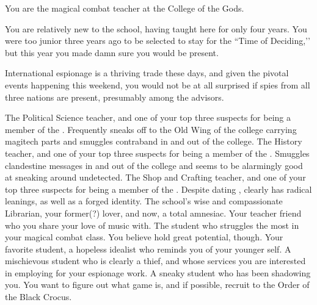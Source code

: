 \documentclass[char]{GL2020}
\begin{document}
\begin{itemz}[Notes]
    \item You are the magical combat teacher at the College of the Gods.
    \item You are relatively new to the school, having taught here for only four years. You were too junior three years ago to be selected to stay for the ``Time of Deciding,’’ but this year you made damn sure you would be present.
    \item International espionage is a thriving trade these days, and given the pivotal events happening this weekend, you would not be at all surprised if spies from all three nations are present, presumably among the advisors.
\end{itemz}

\begin{contacts}
    \contact{\cChupInventor{}} The Political Science teacher, and one of your top three suspects for being a member of the \pGoaties{}. Frequently sneaks off to the Old Wing of the college carrying magitech parts and smuggles contraband in and out of the college.
    \contact{\cHistory{}} The History teacher, and one of your top three suspects for being a member of the \pGoaties{}. Smuggles clandestine messages in and out of the college and seems to be alarmingly good at sneaking around undetected.
    \contact{\cPirate{}} The Shop and Crafting teacher, and one of your top three suspects for being a member of the \pGoaties{}. Despite dating \cPrince{\full}, \cPirate{} clearly has radical leanings, as well as a forged identity.
    \contact{\cLibrarian{}} The school’s wise and compassionate Librarian, your former(?) lover, and now, a total amnesiac. 
    \contact{\cMusic{}} Your teacher friend who you share your love of music with.
    \contact{\cAdopted{}} The student who struggles the most in your magical combat class. You believe \cAdopted{\they} hold\cAdopted{\verbs} great potential, though.
    \contact{\cDisney{}} Your favorite student, a hopeless idealist who reminds you of your younger self.
    \contact{\cPirateChild{}} A mischievous student who is clearly a thief, and whose services you are interested in employing for your espionage work.
    \contact{\cLibAssist{}} A sneaky student who has been shadowing you. You want to figure out what \cLibAssist{\their} game is, and if possible, recruit \cLibAssist{\them} to the Order of the Black Crocus.
\end{contacts}
\end{document}
